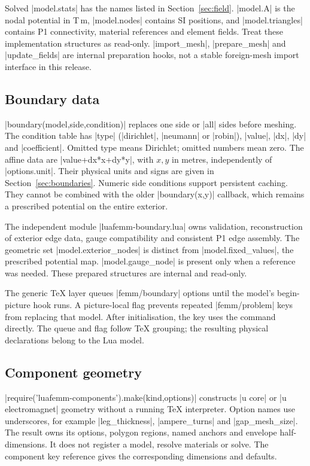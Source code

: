 Solved |model.stats| has the names listed in Section~\ref{sec:field}.
|model.A| is the nodal potential in T\,m, |model.nodes| contains SI positions,
and |model.triangles| contains P1 connectivity, material references and
element fields. Treat these implementation structures as read-only.
|import_mesh|, |prepare_mesh| and |update_fields| are internal preparation hooks, not a
stable foreign-mesh import interface in this release.

\subsection{Boundary data}
|boundary(model,side,condition)| replaces one side or |all| sides before
meshing. The condition table has |type| (|dirichlet|, |neumann| or |robin|),
|value|, |dx|, |dy| and |coefficient|. Omitted type means Dirichlet; omitted
numbers mean zero. The affine data are |value+dx*x+dy*y|, with $x,y$ in
metres, independently of |options.unit|. Their physical units and signs
are given in Section~\ref{sec:boundaries}. Numeric side conditions support
persistent caching. They cannot be combined with the older |boundary(x,y)|
callback, which remains a prescribed potential on the entire exterior.

The independent module |luafemm-boundary.lua| owns validation, reconstruction
of exterior edge data, gauge compatibility and consistent P1 edge assembly.
The geometric set |model.exterior_nodes| is distinct from |model.fixed_values|,
the prescribed potential map. |model.gauge_node| is present only when a
reference was needed. These prepared structures are internal and read-only.

The generic TeX layer queues |femm/boundary| options until the model's
begin-picture hook runs. A picture-local flag prevents repeated
|femm/problem| keys from replacing that model. After initialisation,
the key uses the command directly. The queue and flag follow TeX grouping;
the resulting physical declarations belong to the Lua model.

\subsection{Component geometry}
|require('luafemm-components').make(kind,options)| constructs |u core| or
|u electromagnet| geometry without a running TeX interpreter. Option names
use underscores, for example |leg_thickness|, |ampere_turns| and |gap_mesh_size|.
The result owns its options, polygon regions, named anchors and envelope
half-dimensions. It does not register a model, resolve materials or solve.
The component key reference gives the corresponding dimensions and defaults.

